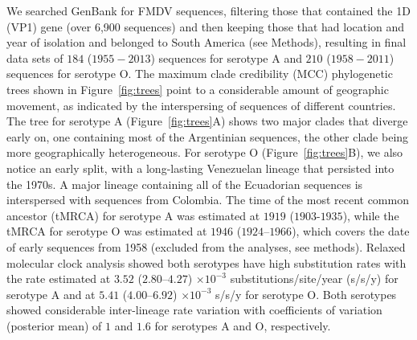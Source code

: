 \documentclass[10pt]{article}
\begin{document}
We searched GenBank for FMDV sequences, filtering those that contained the 1D (VP1) gene (over 6,900 sequences) and then keeping those that had location and year of isolation and belonged to South America (see Methods), resulting in final data sets of $184$ ($1955-2013$) sequences for serotype A and $210$ ($1958-2011$) sequences for serotype O.
The maximum clade credibility (MCC) phylogenetic trees shown in Figure~\ref{fig:trees} point to a considerable amount of geographic movement, as indicated by the interspersing of sequences of different countries.
The tree for serotype A (Figure~\ref{fig:trees}A) shows two major clades that diverge early on, one containing most of the Argentinian sequences, the other clade being more geographically heterogeneous.
For serotype O (Figure~\ref{fig:trees}B), we also notice an early split, with a long-lasting Venezuelan lineage that persisted into the 1970s. 
A major lineage containing all of the Ecuadorian sequences is interspersed with sequences from Colombia.
The time of the most recent common ancestor (tMRCA) for serotype A was estimated at $1919$ ($1903$-$1935$), while the tMRCA for serotype O was estimated at $1946$ ($1924$--$1966$), which covers the date of early sequences from 1958 (excluded from the analyses, see methods).
Relaxed molecular clock analysis showed both serotypes have high substitution rates with the rate estimated at $3.52$ ($2.80$--$4.27$) $\times 10^{-3}$ substitutions/site/year (s/s/y) for serotype A  and at  $5.41$ ($4.00$--$6.92$) $\times 10^{-3}$ s/s/y for serotype O.
Both serotypes showed considerable inter-lineage rate variation with coefficients of variation (posterior mean) of $1$ and $1.6$ for serotypes A and O, respectively.
\end{document}
